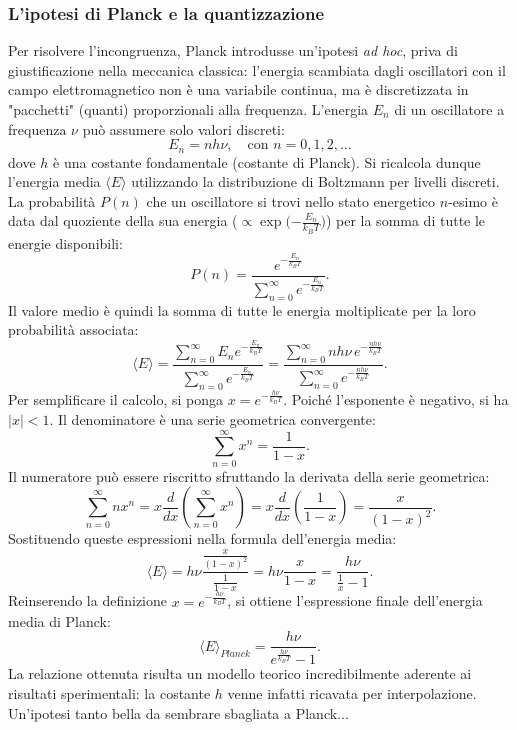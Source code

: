 \documentclass[a4paper,11pt]{report}
\begin{document}
\subsubsection{L'ipotesi di Planck e la quantizzazione}
Per risolvere l'incongruenza, Planck introdusse un'ipotesi \textit{ad hoc}, priva di giustificazione nella meccanica classica: l'energia scambiata dagli oscillatori con il campo elettromagnetico non è una variabile continua, ma è discretizzata in "pacchetti" (quanti) proporzionali alla frequenza.
L'energia $E_n$ di un oscillatore a frequenza $\nu$ può assumere solo valori discreti:
\begin{equation}
    E_n = n h \nu, \quad \text{con } n = 0, 1, 2, \dots
\end{equation}
dove $h$ è una costante fondamentale (costante di Planck).
Si ricalcola dunque l'energia media $\langle E \rangle$ utilizzando la distribuzione di Boltzmann per livelli discreti. La probabilità $P(n)$ che un oscillatore si trovi nello stato energetico $n$-esimo è data dal quoziente della sua energia ($\propto \exp{(-\frac{E_n}{k_B T}})$) per la somma di tutte le energie disponibili:
\begin{equation}
    P(n) = \frac{e^{-\frac{E_n}{k_B T}}}{\sum_{n=0}^{\infty} e^{-\frac{E_n}{k_B T}}}.
\end{equation}
Il valore medio è quindi la somma di tutte le energia moltiplicate per la loro probabilità associata:
\begin{equation}
    \langle E \rangle = \frac{\sum_{n=0}^{\infty} E_n e^{-\frac{E_n}{k_B T}}}{\sum_{n=0}^{\infty} e^{-\frac{E_n}{k_B T}}} = \frac{\sum_{n=0}^{\infty} n h \nu \, e^{-\frac{n h \nu}{k_B T}}}{\sum_{n=0}^{\infty} e^{-\frac{n h \nu}{k_B T}}}.
\end{equation}
Per semplificare il calcolo, si ponga $x = e^{-\frac{h \nu}{k_B T}}$. Poiché l'esponente è negativo, si ha $|x| < 1$.
Il denominatore è una serie geometrica convergente:
\begin{equation}
    \sum_{n=0}^{\infty} x^n = \frac{1}{1-x}.
\end{equation}
Il numeratore può essere riscritto sfruttando la derivata della serie geometrica:
\begin{equation}
    \sum_{n=0}^{\infty} n x^n = x \frac{d}{dx} \left( \sum_{n=0}^{\infty} x^n \right) = x \frac{d}{dx} \left( \frac{1}{1-x} \right) = \frac{x}{(1-x)^2}.
\end{equation}
Sostituendo queste espressioni nella formula dell'energia media:
\begin{equation}
    \langle E \rangle = h\nu \frac{\frac{x}{(1-x)^2}}{\frac{1}{1-x}} = h\nu \frac{x}{1-x} = \frac{h\nu}{\frac{1}{x} - 1}.
\end{equation}
Reinserendo la definizione $x = e^{-\frac{h \nu}{k_B T}}$, si ottiene l'espressione finale dell'energia media di Planck:
\begin{equation}
    \langle E \rangle_{Planck} = \frac{h \nu}{e^{\frac{h \nu}{k_B T}} - 1}.
\end{equation}
La relazione ottenuta risulta un modello teorico incredibilmente aderente ai risultati sperimentali: la costante $h$ venne infatti ricavata per interpolazione. Un'ipotesi tanto bella da sembrare sbagliata a Planck...
\end{document}
